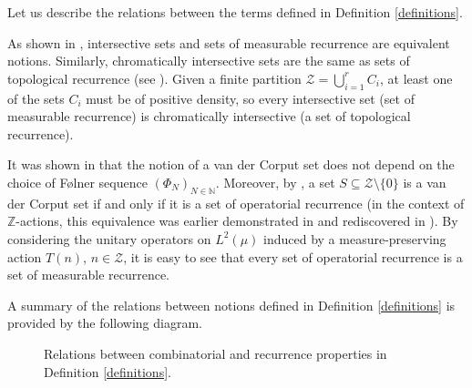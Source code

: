 \documentclass[11pt]{amsart}
\theoremstyle{theorem}
\theoremstyle{definition}
\newcommand{\N}{\mathbb{N}}
\newcommand{\Z}{\mathbb{Z}}
\newcommand{\mZ}{\mathcal{Z}}
\begin{document}
Let us describe the relations between the terms defined in Definition \ref{definitions}.

As shown in \cite[Theorem 2.2]{bm}, intersective sets and sets of measurable recurrence are equivalent notions.
Similarly, chromatically intersective sets are the same as sets of topological recurrence (see \cite[Theorem 2.6]{bm}).
Given a finite partition $\mZ = \bigcup_{i=1}^r C_i$, at least one of the sets $C_i$ must be of positive density, so every intersective set (set of measurable recurrence) is chromatically intersective (a set of topological recurrence).

It was shown in \cite{ftd, saul} that the notion of a van der Corput set does not depend on the choice of F{\o}lner sequence $(\Phi_N)_{N \in \N}$.
Moreover, by \cite[Theorem 3.5]{ftd}, a set $S \subseteq \mZ \setminus \{0\}$ is a van der Corput set if and only if it is a set of operatorial recurrence (in the context of $\Z$-actions, this equivalence was earlier demonstrated in \cite[Theorem 1.1]{peres} and rediscovered in \cite[Theorem 2]{nrs}).
By considering the unitary operators on $L^2(\mu)$ induced by a measure-preserving action $T(n)$, $n \in \mZ$, it is easy to see that every set of operatorial recurrence is a set of measurable recurrence.

A summary of the relations between notions defined in Definition \ref{definitions} is provided by the following diagram.

\begin{figure}[h]
    \begin{mdframed}[align = center, userdefinedwidth=32em]
    \begin{center}
    \end{center}
    \end{mdframed}
    \caption{Relations between combinatorial and recurrence properties in Definition \ref{definitions}.}
    \label{figure}
\end{figure}
\end{document}

